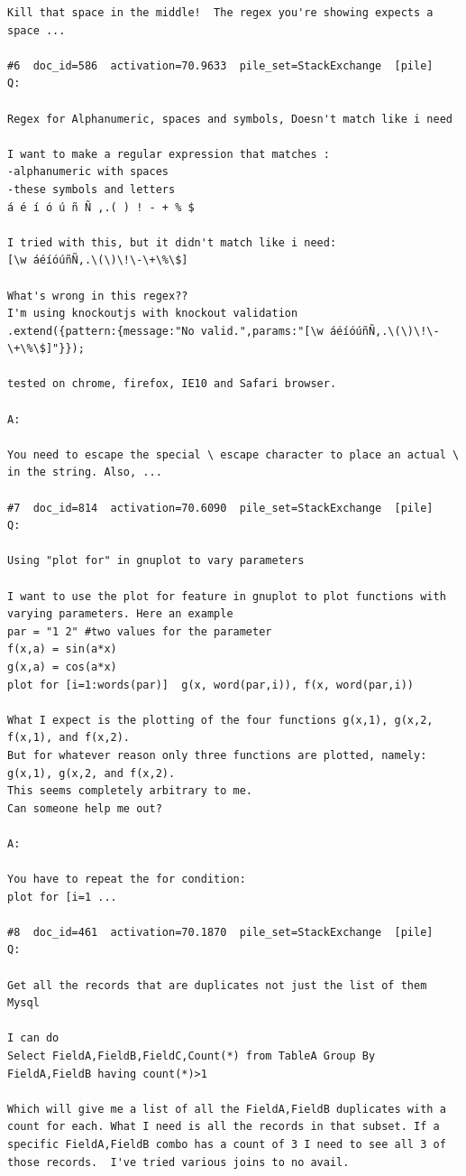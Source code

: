 \begin{verbatim}
Kill that space in the middle!  The regex you're showing expects a space ...

#6  doc_id=586  activation=70.9633  pile_set=StackExchange  [pile]
Q:

Regex for Alphanumeric, spaces and symbols, Doesn't match like i need

I want to make a regular expression that matches :
-alphanumeric with spaces 
-these symbols and letters 
á é í ó ú ñ Ñ ,.( ) ! - + % $

I tried with this, but it didn't match like i need:
[\w áéíóúñÑ,.\(\)\!\-\+\%\$]

What's wrong in this regex??
I'm using knockoutjs with knockout validation 
.extend({pattern:{message:"No valid.",params:"[\w áéíóúñÑ,.\(\)\!\-\+\%\$]"}});

tested on chrome, firefox, IE10 and Safari browser.

A:

You need to escape the special \ escape character to place an actual \ in the string. Also, ...

#7  doc_id=814  activation=70.6090  pile_set=StackExchange  [pile]
Q:

Using "plot for" in gnuplot to vary parameters

I want to use the plot for feature in gnuplot to plot functions with varying parameters. Here an example
par = "1 2" #two values for the parameter
f(x,a) = sin(a*x)
g(x,a) = cos(a*x)
plot for [i=1:words(par)]  g(x, word(par,i)), f(x, word(par,i))

What I expect is the plotting of the four functions g(x,1), g(x,2, f(x,1), and f(x,2).
But for whatever reason only three functions are plotted, namely: g(x,1), g(x,2, and f(x,2).
This seems completely arbitrary to me.
Can someone help me out?

A:

You have to repeat the for condition:
plot for [i=1 ...

#8  doc_id=461  activation=70.1870  pile_set=StackExchange  [pile]
Q:

Get all the records that are duplicates not just the list of them Mysql

I can do
Select FieldA,FieldB,FieldC,Count(*) from TableA Group By FieldA,FieldB having count(*)>1

Which will give me a list of all the FieldA,FieldB duplicates with a count for each. What I need is all the records in that subset. If a specific FieldA,FieldB combo has a count of 3 I need to see all 3 of those records.  I've tried various joins to no avail.


\end{verbatim}
